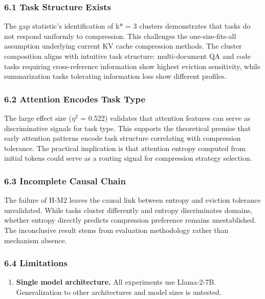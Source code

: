
\subsubsection{6.1 Task Structure Exists}

The gap statistic's identification of k* = 3 clusters demonstrates that tasks do not respond uniformly to compression. This challenges the one-size-fits-all assumption underlying current KV cache compression methods. The cluster composition aligns with intuitive task structure: multi-document QA and code tasks requiring cross-reference information show highest eviction sensitivity, while summarization tasks tolerating information loss show different profiles.

\subsubsection{6.2 Attention Encodes Task Type}

The large effect size ($\eta^2$ = 0.522) validates that attention features can serve as discriminative signals for task type. This supports the theoretical premise that early attention patterns encode task structure correlating with compression tolerance. The practical implication is that attention entropy computed from initial tokens could serve as a routing signal for compression strategy selection.

\subsubsection{6.3 Incomplete Causal Chain}

The failure of H-M2 leaves the causal link between entropy and eviction tolerance unvalidated. While tasks cluster differently and entropy discriminates domains, whether entropy directly predicts compression preference remains unestablished. The inconclusive result stems from evaluation methodology rather than mechanism absence.

\subsubsection{6.4 Limitations}

\begin{enumerate}
\item \textbf{Single model architecture.} All experiments use Llama-2-7B. Generalization to other architectures and model sizes is untested.
\end{enumerate}

